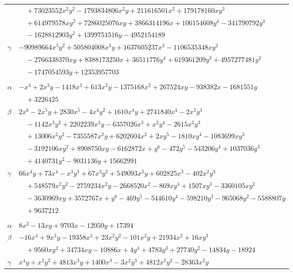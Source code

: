 \documentclass[11pt]{article}
\begin{document}
\begin{longtable}{@{}ll@{}}
 & $\quad +73023552x^{2}y^{2}-1793834806x^{2}y+211616501x^{2}+179178160xy^{3}$\\
 & $\quad +614979578xy^{2}+7286025076xy+3866314196x+106154608y^{4}-341790792y^{3}$\\
 & $\quad -1628812903y^{2}+1399751516y-4952154189$\\
$\gamma$ & $-90989664x^{3}y^{2}+505804008x^{3}y+1637605237x^{3}-1106535348xy^{2}$\\
 & $\quad -2766338370xy+8388173250x+36511776y^{4}+619361209y^{3}+4957277481y^{2}$\\
 & $\quad -1747054593y+12353957703$\\
\addlinespace[3pt]
\multicolumn{2}{@{}l}{$\{i,j\}=\{15,146\}$, $k_{ij}=2^{3}\cdot 3^{4}\cdot 7\cdot 13\cdot 31^{2}$}\\
$\alpha$ & $-x^{4}+2x^{3}y-1418x^{3}+613x^{2}y-1375168x^{2}+267524xy-938382x-1681551y$\\
 & $\quad +3226425$\\
$\beta$ & $2x^{6}-2x^{5}y+2830x^{5}-4x^{4}y^{2}+1610x^{4}y+2741840x^{4}-2x^{3}y^{3}$\\
 & $\quad -1142x^{3}y^{2}+2202239x^{3}y-6357026x^{3}+x^{2}y^{4}-2615x^{2}y^{3}$\\
 & $\quad +13006x^{2}y^{2}-7355587x^{2}y+6202604x^{2}+2xy^{5}-1810xy^{4}-1083699xy^{3}$\\
 & $\quad -3192106xy^{2}+8908750xy-6162872x+y^{6}-472y^{5}-543206y^{4}+1037036y^{3}$\\
 & $\quad +4140731y^{2}-9031136y+15662991$\\
$\gamma$ & $66x^{4}y+73x^{4}-x^{3}y^{3}+67x^{3}y^{2}+549093x^{3}y+602825x^{3}-402x^{2}y^{3}$\\
 & $\quad +548579x^{2}y^{2}-2759234x^{2}y-2668520x^{2}-869xy^{4}+1507xy^{3}-3360105xy^{2}$\\
 & $\quad -3630969xy+3572767x+y^{6}-469y^{5}-544610y^{4}-598210y^{3}-965068y^{2}-5588807y$\\
 & $\quad +9637212$\\
\addlinespace[3pt]
\multicolumn{2}{@{}l}{$\{i,j\}=\{15,201\}$, $k_{ij}=2^{2}\cdot 3^{4}\cdot 31^{2}$}\\
$\alpha$ & $8x^{2}-13xy+9703x-12050y+17394$\\
$\beta$ & $-16x^{4}+9x^{3}y-19358x^{3}+23x^{2}y^{2}-101x^{2}y+21934x^{2}+16xy^{3}$\\
 & $\quad +9560xy^{2}+34734xy-10886x+4y^{4}+4783y^{3}+27740y^{2}-14834y-18924$\\
$\gamma$ & $x^{4}y+x^{3}y^{2}+4813x^{3}y+1400x^{3}-3x^{2}y^{3}+4812x^{2}y^{2}-28363x^{2}y$\\

\end{longtable}
\end{document}
